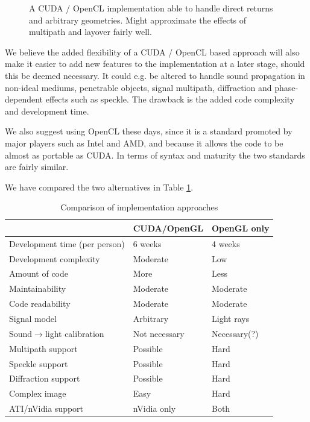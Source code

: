 \documentclass[
   article                                      %
 , 12pt                                         %
 , xelatex                                      %
 , bibtex                                       %
 , layout
]{common/mytemplate}
\begin{document}
\begin{figure}[b]
\caption{A CUDA / OpenCL implementation able to handle direct returns and arbitrary geometries. Might approximate the effects of multipath and layover fairly well.}\label{single_path}
\end{figure}

We believe the added flexibility of a CUDA / OpenCL based approach will also make it easier to add new features to the implementation at a later stage, should this be deemed necessary. It could e.g. be altered to handle sound propagation in non-ideal mediums, penetrable objects, signal multipath, diffraction and phase-dependent effects such as speckle. The drawback is the added code complexity and development time.

We also suggest using OpenCL these days, since it is a standard promoted by major players such as Intel and AMD, and because it allows the code to be almost as portable as CUDA. In terms of syntax and maturity the two standards are fairly similar.

We have compared the two alternatives in Table \ref{comparison}.

\begin{table}[t]\centering
\begin{tabular}[c]{l l l}\hline
\rowcolor{tabBlue}                  & CUDA/OpenGL    & OpenGL only \\\hline
Development time (per person)       & 6 weeks        & 4 weeks     \\
Development complexity              & Moderate       & Low \\
Amount of code                      & More           & Less \\
Maintainability                     & Moderate       & Moderate \\
Code readability                    & Moderate       & Moderate \\
Signal model                        & Arbitrary      & Light rays  \\
Sound$\rightarrow$light calibration & Not necessary  & Necessary(?) \\
Multipath support                   & Possible       & Hard \\
Speckle support                     & Possible       & Hard \\
Diffraction support                 & Possible       & Hard \\
Complex image                       & Easy           & Hard \\
ATI/nVidia support                  & nVidia only    & Both \\
\end{tabular}
\vspace{5pt}\caption{Comparison of implementation approaches}\label{comparison}
\end{table}
\end{document}
